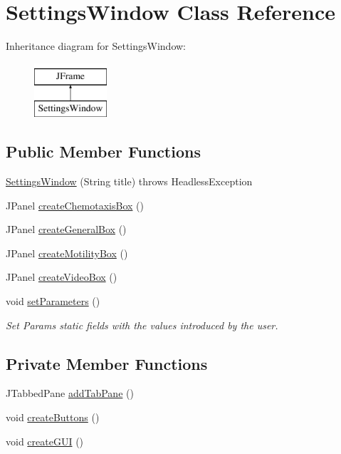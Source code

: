 \hypertarget{classgui_1_1_settings_window}{}\section{Settings\+Window Class Reference}
\label{classgui_1_1_settings_window}
Inheritance diagram for Settings\+Window\+:\begin{figure}[H]
\begin{center}
\leavevmode
\includegraphics[height=2.000000cm]{classgui_1_1_settings_window}
\end{center}
\end{figure}
\subsection*{Public Member Functions}
\begin{DoxyCompactItemize}
\item 
\hyperlink{classgui_1_1_settings_window_a683036e760caa7899d0d992b16a0ce26}{Settings\+Window} (String title)  throws Headless\+Exception 
\item 
J\+Panel \hyperlink{classgui_1_1_settings_window_a770288d77248b778f94df36a48ba95c3}{create\+Chemotaxis\+Box} ()
\item 
J\+Panel \hyperlink{classgui_1_1_settings_window_a0e6de45a38ef84cda8e8d6938dd32ad1}{create\+General\+Box} ()
\item 
J\+Panel \hyperlink{classgui_1_1_settings_window_ac852b9b8b2e0cd2bf5bc764d41e2b0ec}{create\+Motility\+Box} ()
\item 
J\+Panel \hyperlink{classgui_1_1_settings_window_abfe7515fa4028f1aa2cc483ae44f2fc0}{create\+Video\+Box} ()
\item 
void \hyperlink{classgui_1_1_settings_window_a1d6c94586a33965dd4277c7fe62de430}{set\+Parameters} ()
\begin{DoxyCompactList}\small\item\em Set Params static fields with the values introduced by the user. \end{DoxyCompactList}\end{DoxyCompactItemize}
\subsection*{Private Member Functions}
\begin{DoxyCompactItemize}
\item 
J\+Tabbed\+Pane \hyperlink{classgui_1_1_settings_window_a36518806dd93bf1bcbbd809663c30594}{add\+Tab\+Pane} ()
\item 
void \hyperlink{classgui_1_1_settings_window_a48645e737c205837da587e63e4661cc4}{create\+Buttons} ()
\item 
void \hyperlink{classgui_1_1_settings_window_ae3700d532c2ae5e2171016e13584b2d6}{create\+G\+UI} ()
\end{DoxyCompactItemize}


